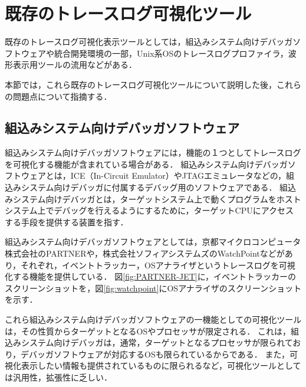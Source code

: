 \section{既存のトレースログ可視化ツール}

既存のトレースログ可視化表示ツールとしては，組込みシステム向けデバッガソフトウェアや統合開発環境の一部，Unix系OSのトレースログプロファイラ，波形表示用ツールの流用などがある．

本節では，これら既存のトレースログ可視化ツールについて説明した後，これらの問題点について指摘する．

\subsection{組込みシステム向けデバッガソフトウェア}

組込みシステム向けデバッガソフトウェアには，機能の１つとしてトレースログを可視化する機能が含まれている場合がある．
組込みシステム向けデバッガソフトウェアとは，ICE（In-Circuit Emulator）やJTAGエミュレータなどの，組込みシステム向けデバッガに付属するデバッグ用のソフトウェアである．
組込みシステム向けデバッガとは，ターゲットシステム上で動くプログラムをホストシステム上でデバッグを行えるようにするために，ターゲットCPUにアクセスする手段を提供する装置を指す．

組込みシステム向けデバッガソフトウェアとしては，京都マイクロコンピュータ株式会社のPARTNER\cite{PARTNER-JET}や，株式会社ソフィアシステムズのWatchPoint\cite{watchpoint}などがあり，それぞれ，イベントトラッカー，OSアナライザというトレースログを可視化する機能を提供している．
図\ref{fig:PARTNER-JET}に，イベントトラッカーのスクリーンショットを，図\ref{fig:watchpoint}にOSアナライザのスクリーンショットを示す．

これら組込みシステム向けデバッガソフトウェアの一機能としての可視化ツールは，その性質からターゲットとなるOSやプロセッサが限定される．
これは，組込みシステム向けデバッガは，通常，ターゲットとなるプロセッサが限られており，デバッガソフトウェアが対応するOSも限られているからである．
また，可視化表示したい情報も提供されているものに限られるなど，可視化ツールとしては汎用性，拡張性に乏しい．

